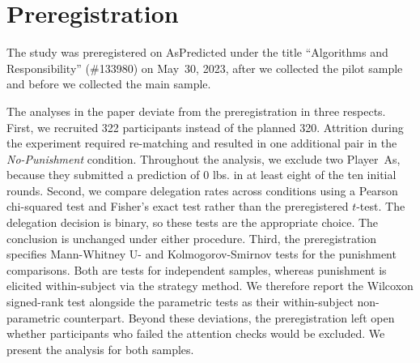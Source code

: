 \pagebreak

\section{Preregistration} \label{appendix:prereg}

The study was preregistered on AsPredicted under the title ``Algorithms and Responsibility'' (\#133980) on May~30, 2023, after we collected the pilot sample and before we collected the main sample.

The analyses in the paper deviate from the preregistration in three respects. First, we recruited 322 participants instead of the planned 320. Attrition during the experiment required re-matching and resulted in one additional pair in the \textit{No-Punishment} condition. Throughout the analysis, we exclude two Player~As, because they submitted a prediction of 0 lbs. in at least eight of the ten initial rounds. Second, we compare delegation rates across conditions using a Pearson chi-squared test and Fisher's exact test rather than the preregistered $t$-test. The delegation decision is binary, so these tests are the appropriate choice. The conclusion is unchanged under either procedure. Third, the preregistration specifies Mann-Whitney U- and Kolmogorov-Smirnov tests for the punishment comparisons. Both are tests for independent samples, whereas punishment is elicited within-subject via the strategy method. We therefore report the Wilcoxon signed-rank test alongside the parametric tests as their within-subject non-parametric counterpart. Beyond these deviations, the preregistration left open whether participants who failed the attention checks would be excluded. We present the analysis for both samples.



